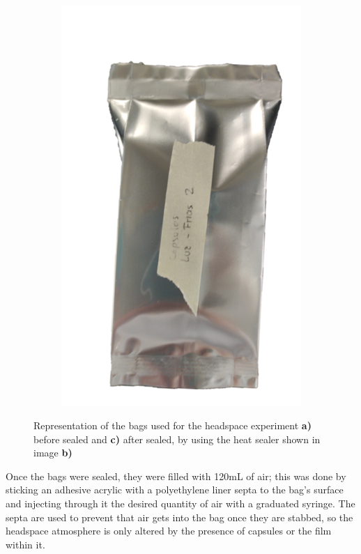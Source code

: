 \begin{refsection}
\begin{figure}[htbp]
\begin{subfigure}[b]{0.3\linewidth}
        \caption{ }
        \label{fig:sealer}
    \end{subfigure}
    \begin{subfigure}[b]{0.3\linewidth}
        \centering
        \includegraphics[width=0.8\linewidth]{Documento_Latex/Tesis_2/Imagenes/Sealed_Bag.png}
        \caption{ }
        \label{fig:sealed_bag}
    \end{subfigure}
    \caption{Representation of the bags used for the headspace experiment \textbf{a)} before sealed and \textbf{c)} after sealed,  by using the heat sealer shown in image \textbf{b)}}
    \label{fig:bags}
\end{figure}

Once the bags were sealed, they were filled with 120mL of air; this was done by sticking an adhesive acrylic with a polyethylene liner septa to the bag's surface and injecting through it the desired quantity of air with a graduated syringe. The septa are used to prevent that air gets into the bag once they are stabbed, so the headspace atmosphere is only altered by the presence of capsules or the film within it.


\end{refsection}
